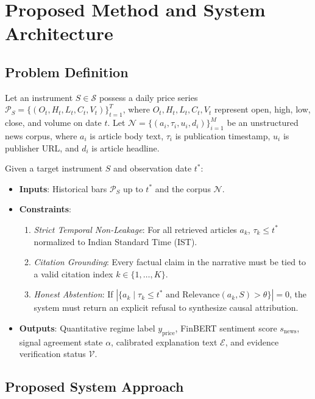 \documentclass{article}
\begin{document}
	\pagebreak	
	\section{Proposed Method and System Architecture}

	\subsection{Problem Definition}

	Let an instrument $S \in \mathcal{S}$ possess a daily price series $\mathcal{P}_S = \{ (O_t, H_t, L_t, C_t, V_t) \}_{t=1}^T$, where $O_t, H_t, L_t, C_t, V_t$ represent open, high, low, close, and volume on date $t$. Let $\mathcal{N} = \{ (a_i, \tau_i, u_i, d_i) \}_{i=1}^M$ be an unstructured news corpus, where $a_i$ is article body text, $\tau_i$ is publication timestamp, $u_i$ is publisher URL, and $d_i$ is article headline.

	Given a target instrument $S$ and observation date $t^*$:
	\begin{itemize}
		\item \textbf{Inputs}: Historical bars $\mathcal{P}_S$ up to $t^*$ and the corpus $\mathcal{N}$.
		\item \textbf{Constraints}:
			\begin{enumerate}
				\item \textit{Strict Temporal Non-Leakage}: For all retrieved articles $a_k$, $\tau_k \le t^*$ normalized to Indian Standard Time (IST).
				\item \textit{Citation Grounding}: Every factual claim in the narrative must be tied to a valid citation index $k \in \{1, \dots, K\}$.
				\item \textit{Honest Abstention}: If $|\{ a_k \mid \tau_k \le t^* \text{ and } \text{Relevance}(a_k, S) > \theta \}| = 0$, the system must return an explicit refusal to synthesize causal attribution.
			\end{enumerate}
		\item \textbf{Outputs}: Quantitative regime label $y_{\text{price}}$, FinBERT sentiment score $s_{\text{news}}$, signal agreement state $\alpha$, calibrated explanation text $\mathcal{E}$, and evidence verification status $\mathcal{V}$.
	\end{itemize}

	\subsection{Proposed System Approach}
\end{document}
